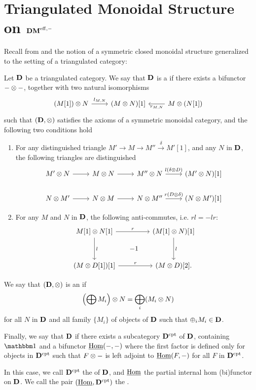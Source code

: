 \section{Triangulated Monoidal Structure on $\DMeff$}
\label{sect_TMS_DMeff}

Recall from \cite[1.13]{MK} and \cite[8A.1]{MVW} the notion of a 
symmetric closed monoidal structure generalized to the setting of 
a triangulated category:

\begin{defn}\label{def_tensor_triang_cat}
Let $\DCat[D]$ be a triangulated category. We say that $\DCat[D]$ 
is a  if there exists a bifunctor
$- \tensor -$, together with two natural isomorphisms 
\[
\begin{tikzcd}
(M[1]) \tensor N \arrow{r}{l_{M, N}}&
(M \tensor N)[1] &
M \tensor (N[1]) \arrow{l}{r_{M, N}}
\end{tikzcd}
\]
such that $(\DCat[D], \tensor)$ satisfies the axioms of a 
symmetric monoidal category, and the following two conditions
hold
\begin{enumerate}
\item For any distinguished triangle $M' \to M \to M'' 
\stackrel{\delta}{\to} M'[1]$, and any $N$ in $\DCat[D]$,
the following triangles are distinguished
\[
\begin{tikzcd}
M' \tensor N \arrow{r} &
M \tensor N \arrow{r} &
M'' \tensor N \arrow{r}{l(\delta \tensor D)}&
(M' \tensor N)[1] \\
N \tensor M' \arrow{r} &
N \tensor M \arrow{r} &
N \tensor M'' \arrow{r}{r(D \tensor \delta)}&
(N \tensor M')[1]
\end{tikzcd}
\]

\item For any $M$ and $N$ in $\DCat[D]$, the following 
anti-commutes, i.e. $rl = -lr$:
\[
\begin{tikzcd}[row sep=small, column sep=small]
M[1] \tensor N[1] \arrow{rr}{r}\arrow{dd}{l} && 
(M[1] \tensor N)[1] \arrow{dd}{l} \\
& -1 \\
(M \tensor D[1])[1] \arrow{rr}{r} &&
(M \tensor D)[2].
\end{tikzcd}
\]
\end{enumerate}

We say that $(\DCat, \tensor)$ is an  if 
\[
\left(\bigoplus M_i\right) \tensor N = \bigoplus_i (M_i \tensor N)
\]
for all $N$ in $\DCat$ and all family $\{M_i\}$ of objects of 
$\DCat$ such that $\oplus_i M_i \in \DCat$. 

Finally, we say that $\DCat$  if 
there exists a subcategory $\DCat^{\compact}$ of $\DCat$, 
containing $\Unit$ and a bifunctor $\ihom(-,-)$ where the first 
factor is defined only for objects in $\DCat^{\compact}$ such that 
$F \tensor -$ is left adjoint to $\ihom(F, -)$ for all $F$ in 
$\DCat^{\compact}$.

In this case, we call $\DCat^{\compact}$ the  
of $\DCat$, and $\ihom$ the partial internal hom (bi)functor on
$\DCat$. We call the pair $(\ihom, \DCat^{\compact})$ the .
\end{defn}

